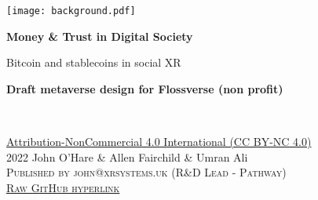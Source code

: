 \documentclass[
	12pt, %
	fleqn, %
	a4paper, %
	oneside, %
]{LegrandOrangeBook}
\begin{document}

\titlepage %
	{\texttt{[image: background.pdf]}} %
	{ %
		\centering\sffamily %
		{\Huge\bfseries Money \& Trust in Digital Society\par} %
		\vspace{16pt} %
		{\LARGE Bitcoin and stablecoins in  social XR\\}  %
		\vspace{24pt} %
		{\large \textbf{Draft metaverse design for Flossverse (non profit)}\par} %
	}


\thispagestyle{empty} %

~\vfill %

\noindent \href{https://creativecommons.org/licenses/by-nc/4.0/}{Attribution-NonCommercial 4.0 International (CC BY-NC 4.0) }\\ 2022 John O'Hare \& Allen Fairchild \& Umran Ali\\ %

\noindent \textsc{Published by john@xrsystems.uk (R\&D Lead - Pathway)}\\ %

\noindent \textsc{\href{https://github.com/flossverse/origin/blob/draft/Book/metaverseBTC.pdf}{Raw GitHub hyperlink}}\\ %
\end{document}
